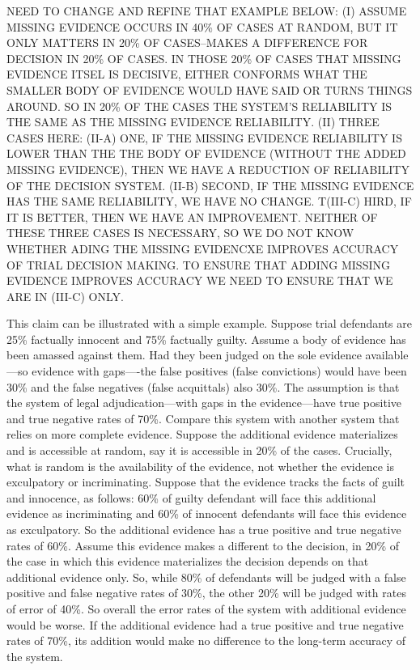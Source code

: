 \documentclass[
  10pt,
  dvipsnames,enabledeprecatedfontcommands]{scrartcl}
\begin{document}
NEED TO CHANGE AND REFINE THAT EXAMPLE BELOW: (I) ASSUME MISSING
EVIDENCE OCCURS IN 40\% OF CASES AT RANDOM, BUT IT ONLY MATTERS IN 20\%
OF CASES--MAKES A DIFFERENCE FOR DECISION IN 20\% OF CASES. IN THOSE
20\% OF CASES THAT MISSING EVIDENCE ITSEL IS DECISIVE, EITHER CONFORMS
WHAT THE SMALLER BODY OF EVIDENCE WOULD HAVE SAID OR TURNS THINGS
AROUND. SO IN 20\% OF THE CASES THE SYSTEM'S RELIABILITY IS THE SAME AS
THE MISSING EVIDENCE RELIABILITY. (II) THREE CASES HERE: (II-A) ONE, IF
THE MISSING EVIDENCE RELIABILITY IS LOWER THAN THE THE BODY OF EVIDENCE
(WITHOUT THE ADDED MISSING EVIDENCE), THEN WE HAVE A REDUCTION OF
RELIABILITY OF THE DECISION SYSTEM. (II-B) SECOND, IF THE MISSING
EVIDENCE HAS THE SAME RELIABILITY, WE HAVE NO CHANGE. T(III-C) HIRD, IF
IT IS BETTER, THEN WE HAVE AN IMPROVEMENT. NEITHER OF THESE THREE CASES
IS NECESSARY, SO WE DO NOT KNOW WHETHER ADING THE MISSING EVIDENCXE
IMPROVES ACCURACY OF TRIAL DECISION MAKING. TO ENSURE THAT ADDING
MISSING EVIDENCE IMPROVES ACCURACY WE NEED TO ENSURE THAT WE ARE IN
(III-C) ONLY.

This claim can be illustrated with a simple example. Suppose trial
defendants are 25\% factually innocent and 75\% factually guilty. Assume
a body of evidence has been amassed against them. Had they been judged
on the sole evidence available---so evidence with gaps----the false
positives (false convictions) would have been 30\% and the false
negatives (false acquittals) also 30\%. The assumption is that the
system of legal adjudication---with gaps in the evidence---have true
positive and true negative rates of 70\%. Compare this system with
another system that relies on more complete evidence. Suppose the
additional evidence materializes and is accessible at random, say it is
accessible in 20\% of the cases. Crucially, what is random is the
availability of the evidence, not whether the evidence is exculpatory or
incriminating. Suppose that the evidence tracks the facts of guilt and
innocence, as follows: 60\% of guilty defendant will face this
additional evidence as incriminating and 60\% of innocent defendants
will face this evidence as exculpatory. So the additional evidence has a
true positive and true negative rates of 60\%. Assume this evidence
makes a different to the decision, in 20\% of the case in which this
evidence materializes the decision depends on that additional evidence
only. So, while 80\% of defendants will be judged with a false positive
and false negative rates of 30\%, the other 20\% will be judged with
rates of error of 40\%. So overall the error rates of the system with
additional evidence would be worse. If the additional evidence had a
true positive and true negative rates of 70\%, its addition would make
no difference to the long-term accuracy of the system.
\end{document}
